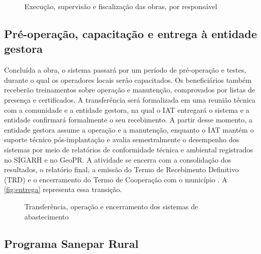 \begin{figure}[htbp]
  \centering
  \caption{Execução, supervisão e fiscalização das obras, por responsável}
  \label{fig:obras}
\end{figure}


\subsection{Pré-operação, capacitação e entrega à entidade gestora}
\label{subsec:entrega}

Concluída a obra, o sistema passará por um período de pré-operação e
testes, durante o qual os operadores locais serão capacitados. Os
beneficiários também receberão treinamentos sobre operação e manutenção,
comprovados por listas de presença e certificados. A transferência será
formalizada em uma reunião técnica com a comunidade e a entidade gestora, na
qual o IAT entregará o sistema e a entidade confirmará formalmente o seu
recebimento. A partir desse momento, a entidade gestora assume a operação e a
manutenção, enquanto o IAT mantém o suporte técnico pós-implantação e avalia
semestralmente o desempenho dos sistemas por meio de relatórios de
conformidade técnica e ambiental registrados no SIGARH e no GeoPR. A
atividade se encerra com a consolidação dos resultados, o relatório final, a
emissão do Termo de Recebimento Definitivo (TRD) e o encerramento do Termo de
Cooperação com o município \cite{mop2026}. A \autoref{fig:entrega} representa
essa transição.

\begin{figure}[htbp]
  \centering
  \caption{Transferência, operação e encerramento dos sistemas de abastecimento}
  \label{fig:entrega}
\end{figure}

\subsection{Programa Sanepar Rural}
\label{subsec:sanepar-rural}

